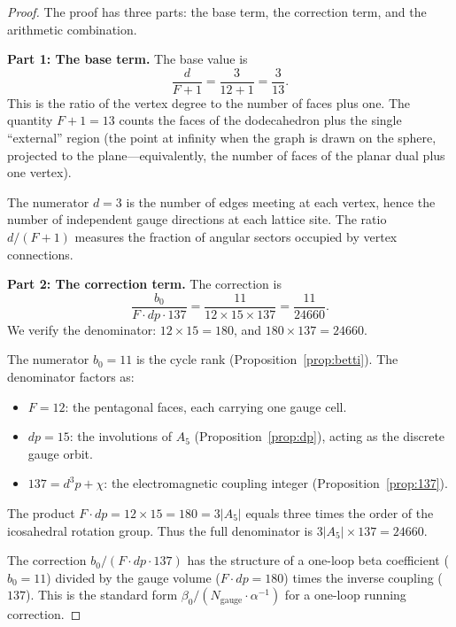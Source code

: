 \documentclass[11pt,a4paper]{article}
\theoremstyle{plain}
\theoremstyle{definition}
\begin{document}
\begin{proof}
The proof has three parts: the base term, the correction term, and the
arithmetic combination.

\medskip
\noindent\textbf{Part 1: The base term.}
The base value is
\begin{equation}\label{eq:base}
  \frac{d}{F+1} = \frac{3}{12 + 1} = \frac{3}{13}.
\end{equation}
This is the ratio of the vertex degree to the number of faces plus
one.  The quantity $F + 1 = 13$ counts the faces of the dodecahedron
plus the single ``external'' region (the point at infinity when the
graph is drawn on the sphere, projected to the plane---equivalently,
the number of faces of the planar dual plus one vertex).

The numerator $d = 3$ is the number of edges meeting at each vertex,
hence the number of independent gauge directions at each lattice site.
The ratio $d/(F + 1)$ measures the fraction of angular sectors occupied
by vertex connections.

\medskip
\noindent\textbf{Part 2: The correction term.}
The correction is
\begin{equation}\label{eq:correction}
  \frac{b_{0}}{F \cdot dp \cdot 137}
  = \frac{11}{12 \times 15 \times 137}
  = \frac{11}{24660}.
\end{equation}
We verify the denominator:
$12 \times 15 = 180$, and $180 \times 137 = 24660$.

The numerator $b_{0} = 11$ is the cycle rank (Proposition~\ref{prop:betti}).
The denominator factors as:
\begin{itemize}[nosep]
  \item $F = 12$: the pentagonal faces, each carrying one gauge cell.
  \item $dp = 15$: the involutions of $A_{5}$
    (Proposition~\ref{prop:dp}), acting as the discrete gauge orbit.
  \item $137 = d^{3}p + \chi$: the electromagnetic coupling integer
    (Proposition~\ref{prop:137}).
\end{itemize}
The product $F \cdot dp = 12 \times 15 = 180 = 3|A_{5}|$ equals three
times the order of the icosahedral rotation group.  Thus the full
denominator is $3|A_{5}| \times 137 = 24660$.

The correction $b_{0}/(F \cdot dp \cdot 137)$ has the structure of a
one-loop beta coefficient ($b_{0} = 11$) divided by the gauge volume
($F \cdot dp = 180$) times the inverse coupling ($137$).  This is
the standard form $\beta_{0}/(N_{\mathrm{gauge}} \cdot \alpha^{-1})$
for a one-loop running correction.


\end{proof}
\end{document}
